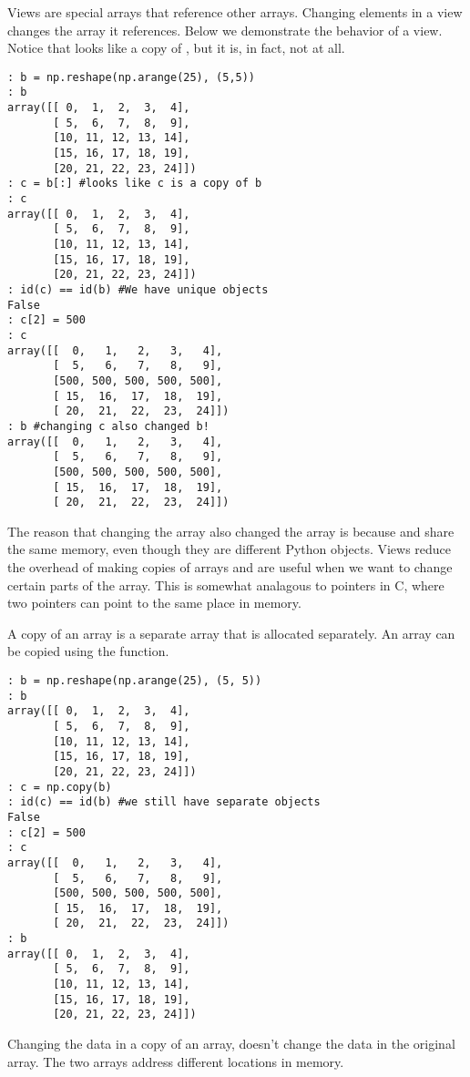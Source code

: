 Views are special arrays that reference other arrays.
Changing elements in a view changes the array it references.
Below we demonstrate the behavior of a view.
Notice that  looks like a copy of , but it is, in fact, not at all.
\begin{lstlisting}
: b = np.reshape(np.arange(25), (5,5))
: b
array([[ 0,  1,  2,  3,  4],
       [ 5,  6,  7,  8,  9],
       [10, 11, 12, 13, 14],
       [15, 16, 17, 18, 19],
       [20, 21, 22, 23, 24]])
: c = b[:] #looks like c is a copy of b
: c
array([[ 0,  1,  2,  3,  4],
       [ 5,  6,  7,  8,  9],
       [10, 11, 12, 13, 14],
       [15, 16, 17, 18, 19],
       [20, 21, 22, 23, 24]])
: id(c) == id(b) #We have unique objects
False
: c[2] = 500
: c
array([[  0,   1,   2,   3,   4],
       [  5,   6,   7,   8,   9],
       [500, 500, 500, 500, 500],
       [ 15,  16,  17,  18,  19],
       [ 20,  21,  22,  23,  24]])
: b #changing c also changed b!
array([[  0,   1,   2,   3,   4],
       [  5,   6,   7,   8,   9],
       [500, 500, 500, 500, 500],
       [ 15,  16,  17,  18,  19],
       [ 20,  21,  22,  23,  24]])
\end{lstlisting}

The reason that changing the array  also changed the array  is because  and  share the same memory, even though they are different Python objects.
Views reduce the overhead of making copies of arrays and are useful when we want to change certain parts of the array.
This is somewhat analagous to pointers in C, where two pointers can point to the same place in memory.

A copy of an array is a separate array that is allocated separately.
An array can be copied using the  function.
\begin{lstlisting}
: b = np.reshape(np.arange(25), (5, 5))
: b
array([[ 0,  1,  2,  3,  4],
       [ 5,  6,  7,  8,  9],
       [10, 11, 12, 13, 14],
       [15, 16, 17, 18, 19],
       [20, 21, 22, 23, 24]])
: c = np.copy(b)
: id(c) == id(b) #we still have separate objects
False
: c[2] = 500
: c
array([[  0,   1,   2,   3,   4],
       [  5,   6,   7,   8,   9],
       [500, 500, 500, 500, 500],
       [ 15,  16,  17,  18,  19],
       [ 20,  21,  22,  23,  24]])
: b
array([[ 0,  1,  2,  3,  4],
       [ 5,  6,  7,  8,  9],
       [10, 11, 12, 13, 14],
       [15, 16, 17, 18, 19],
       [20, 21, 22, 23, 24]])
\end{lstlisting}
Changing the data in a copy of an array, doesn't change the data in the original array.
The two arrays address different locations in memory.

